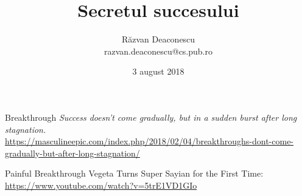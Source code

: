 \documentclass{beamer}
\title[Secretul succesului]{Secretul succesului}
\institute{InfoEducație 2018 (Gălăciuc, Vrancea)}
\author[Răzvan Deaconescu]{Răzvan Deaconescu \\
razvan.deaconescu@cs.pub.ro}
\date{3 august 2018}
\begin{document}
\frame{\titlepage}

%

\begin{frame}{Breakthrough}
  \centering
  \textit{Success doesn't come gradually, but in a sudden burst after long stagnation.}\\
  \vspace{3mm}
  \tiny{\url{https://masculineepic.com/index.php/2018/02/04/breakthroughs-dont-come-gradually-but-after-long-stagnation/}}
\end{frame}

\begin{frame}{Painful Breakthrough}
  \centering
  Vegeta Turns Super Sayian for the First Time: \url{https://www.youtube.com/watch?v=5trE1VD1GIo}
\end{frame}


\end{document}
